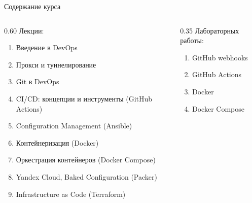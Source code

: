 \documentclass[aspectratio=169]{beamer}
\begin{document}
    \begin{frame}{Содержание курса}
        \begin{columns}[t]
            \begin{column}[t]{0.60\textwidth}
                Лекции:
                \begin{enumerate}
                    \small
                    \item Введение в DevOps
                    \item Прокси и туннелирование
                    \item Git в DevOps
                    \item CI/CD: концепции и инструменты (GitHub Actions)
                    \item Configuration Management (Ansible)
                    \item Контейнеризация (Docker)
                    \item Оркестрация контейнеров (Docker Compose)
                    \item Yandex Cloud, Baked Configuration (Packer)
                    \item Infrastructure as Code (Terraform)
                \end{enumerate}
            \end{column}
            \begin{column}[t]{0.35\textwidth}
                Лабораторных работы:
                \begin{enumerate}
                    \item GitHub webhooks
                    \item GitHub Actions
                    \item Docker
                    \item Docker Compose
                \end{enumerate}
            \end{column}
        \end{columns}
    \end{frame}
\end{document}
